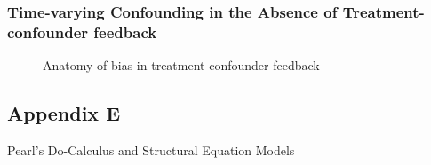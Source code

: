\documentclass[
  single column]{article}
\begin{document}
\newpage{}

\subsubsection{Time-varying Confounding in the Absence of
Treatment-confounder
feedback}\label{time-varying-confounding-in-the-absence-of-treatment-confounder-feedback}

\begin{figure}

\centering{

\feedbackB

}

\caption{\label{fig-timevarying-nofeedback}Anatomy of bias in
treatment-confounder feedback}

\end{figure}%

\newpage{}

\subsection{Appendix E}\label{appendix-e}

Pearl's Do-Calculus and Structural Equation Models

\newpage{}
\end{document}
